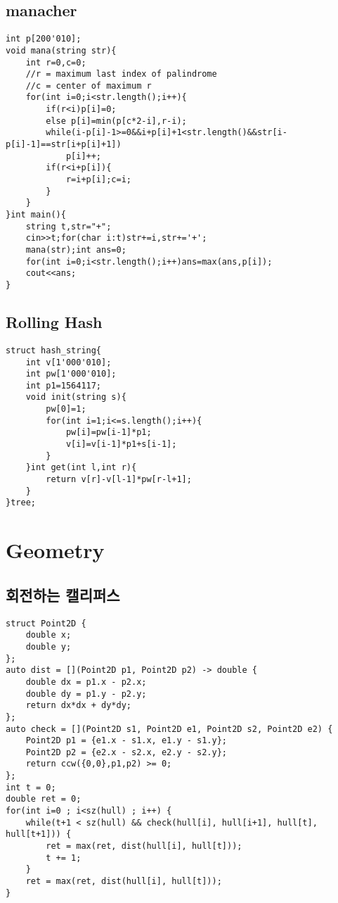 \documentclass[landscape, 8pt, a4paper, oneside, twocolumn]{extarticle}
\begin{document}
\subsection{manacher}
\begin{verbatim}
int p[200'010];
void mana(string str){
    int r=0,c=0;
    //r = maximum last index of palindrome
    //c = center of maximum r
    for(int i=0;i<str.length();i++){
        if(r<i)p[i]=0;
        else p[i]=min(p[c*2-i],r-i);
        while(i-p[i]-1>=0&&i+p[i]+1<str.length()&&str[i-p[i]-1]==str[i+p[i]+1])
            p[i]++;
        if(r<i+p[i]){
            r=i+p[i];c=i;
        }
    }
}int main(){
    string t,str="+";
    cin>>t;for(char i:t)str+=i,str+='+';
    mana(str);int ans=0;
    for(int i=0;i<str.length();i++)ans=max(ans,p[i]);
    cout<<ans;
}
\end{verbatim}
\subsection{Rolling Hash}
\begin{verbatim}
struct hash_string{
    int v[1'000'010];
    int pw[1'000'010];
    int p1=1564117;
    void init(string s){
        pw[0]=1;
        for(int i=1;i<=s.length();i++){
            pw[i]=pw[i-1]*p1;
            v[i]=v[i-1]*p1+s[i-1];
        }
    }int get(int l,int r){
        return v[r]-v[l-1]*pw[r-l+1];
    }
}tree;
\end{verbatim}
\section{Geometry}
\subsection{회전하는 캘리퍼스}
\begin{verbatim}
struct Point2D {
    double x;
    double y;
};
auto dist = [](Point2D p1, Point2D p2) -> double {
    double dx = p1.x - p2.x;
    double dy = p1.y - p2.y;
    return dx*dx + dy*dy;
};
auto check = [](Point2D s1, Point2D e1, Point2D s2, Point2D e2) {
    Point2D p1 = {e1.x - s1.x, e1.y - s1.y};
    Point2D p2 = {e2.x - s2.x, e2.y - s2.y};
    return ccw({0,0},p1,p2) >= 0;
};
int t = 0;
double ret = 0;
for(int i=0 ; i<sz(hull) ; i++) {
    while(t+1 < sz(hull) && check(hull[i], hull[i+1], hull[t], hull[t+1])) {
        ret = max(ret, dist(hull[i], hull[t]));
        t += 1;
    }
    ret = max(ret, dist(hull[i], hull[t]));
}
\end{verbatim}
\end{document}
